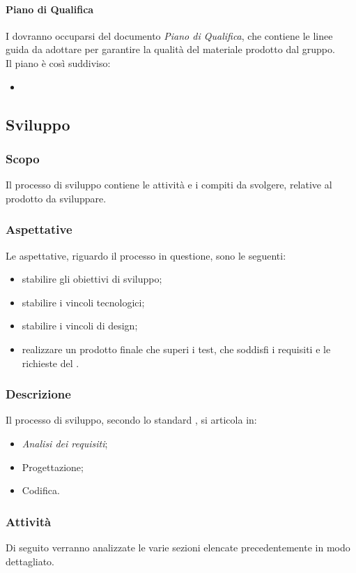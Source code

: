 			\paragraph{Piano di Qualifica}
			I  dovranno occuparsi del documento \textit{Piano di Qualifica}, che contiene le linee guida da adottare per garantire la qualità del materiale prodotto dal gruppo.
			\\
			Il piano è così suddiviso:			 
			\begin{itemize}
				\item 
			\end{itemize}
	\subsection{Sviluppo}
		\subsubsection{Scopo}
		Il processo di sviluppo contiene le attività e i compiti da svolgere, relative al prodotto da sviluppare.
		\subsubsection{Aspettative}
		Le aspettative, riguardo il processo in questione, sono le seguenti:
		\begin{itemize}
			\item stabilire gli obiettivi di sviluppo;
			\item stabilire i vincoli tecnologici;
			\item stabilire i vincoli di design;
			\item realizzare un prodotto finale che superi i test, che soddisfi i requisiti e le richieste del .
		\end{itemize}
		\subsubsection{Descrizione}
		Il processo di sviluppo, secondo lo standard , si articola in:
		\begin{itemize}
			\item \textit{Analisi dei requisiti};
			\item Progettazione;
			\item Codifica.
		\end{itemize}
		\subsubsection{Attività}
		Di seguito verranno analizzate le varie sezioni elencate precedentemente in modo dettagliato.
